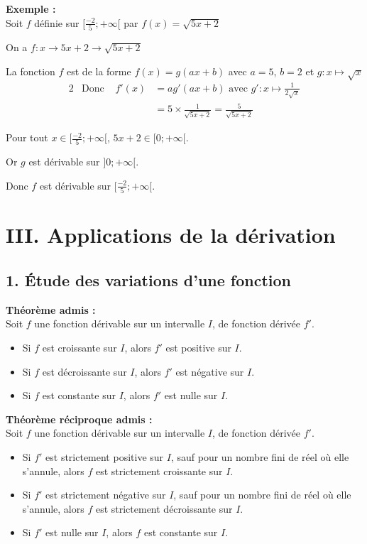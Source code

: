 \documentclass[11pt,a4paper]{article}
\begin{document}
\textbf{Exemple :} ~\\
Soit $f$ définie sur $[\frac{-2}{5};+\infty[$ par $f(x)=\sqrt{5x+2}$

On a $f:x \longrightarrow 5x+2 \longrightarrow  \sqrt{5x+2}$

La fonction $f$ est de la forme $f(x)=g(ax+b)$ avec $a=5$, $b=2$ et $g:x\mapsto\sqrt{x}$
\begin{alignat*}{2}
     & \text{Donc } & f'(x) & =ag'(ax+b) \text{ avec } g':x\mapsto\frac{1}{2\sqrt{x}} \\
     &              &       & =5\times \frac{1}{\sqrt{5x+2}} =\frac{5}{\sqrt{5x+2}}
\end{alignat*}

Pour tout $x\in[\frac{-2}{5};+\infty[$, $5x+2\in[0;+\infty[$.

            Or $g$ est dérivable sur $]0;+\infty[$.

Donc $f$ est dérivable sur $[\frac{-2}{5};+\infty[$.

\section*{III. Applications de la dérivation}

\subsection*{1. Étude des variations d'une fonction}

\begin{mdframed}[style=proprieteStyle]
    \textbf{Théorème admis :} ~\\
    Soit $f$ une fonction dérivable sur un intervalle $I$, de fonction dérivée $f'$.
    \begin{itemize}
        \item Si $f$ est croissante sur $I$, alors $f'$ est positive sur $I$.
        \item Si $f$ est décroissante sur $I$, alors $f'$ est négative sur $I$.
        \item Si $f$ est constante sur $I$, alors $f'$ est nulle sur $I$.
    \end{itemize}
\end{mdframed}

\begin{mdframed}[style=proprieteStyle]
    \textbf{Théorème réciproque admis :} ~\\
    Soit $f$ une fonction dérivable sur un intervalle $I$, de fonction dérivée $f'$.
    \begin{itemize}
        \item Si $f'$ est strictement positive sur $I$, sauf pour un nombre fini de réel où elle s'annule, alors $f$ est strictement croissante sur $I$.
        \item Si $f'$ est strictement négative sur $I$, sauf pour un nombre fini de réel où elle s'annule, alors $f$ est strictement décroissante sur $I$.
        \item Si $f'$ est nulle sur $I$, alors $f$ est constante sur $I$.
    \end{itemize}
\end{mdframed}
\end{document}
